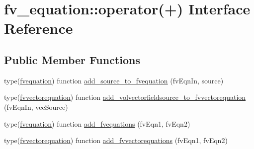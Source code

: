 \hypertarget{interfacefv__equation_1_1operator_07_09_08}{\section{fv\-\_\-equation\-:\-:operator(+) Interface Reference}
\label{interfacefv__equation_1_1operator_07_09_08}
}
\subsection*{Public Member Functions}
\begin{DoxyCompactItemize}
\item 
type(\hyperlink{structfv__equation_1_1fvequation}{fvequation}) function \hyperlink{interfacefv__equation_1_1operator_07_09_08_ad4d565e8a937d349d09c5ef88dec7548}{add\-\_\-source\-\_\-to\-\_\-fvequation} (fv\-Eqn\-In, source)
\item 
type(\hyperlink{structfv__equation_1_1fvvectorequation}{fvvectorequation}) function \hyperlink{interfacefv__equation_1_1operator_07_09_08_a0000272d0178a3702da16779b9dccbc5}{add\-\_\-volvectorfieldsource\-\_\-to\-\_\-fvvectorequation} (fv\-Eqn\-In, vec\-Source)
\item 
type(\hyperlink{structfv__equation_1_1fvequation}{fvequation}) function \hyperlink{interfacefv__equation_1_1operator_07_09_08_aa1e8fb5ae9f7b1450dd8d2017ea6c8b5}{add\-\_\-fvequations} (fv\-Eqn1, fv\-Eqn2)
\item 
type(\hyperlink{structfv__equation_1_1fvvectorequation}{fvvectorequation}) function \hyperlink{interfacefv__equation_1_1operator_07_09_08_a285a3e041c8a16c67efb1fccf4cef1a9}{add\-\_\-fvvectorequations} (fv\-Eqn1, fv\-Eqn2)
\end{DoxyCompactItemize}


